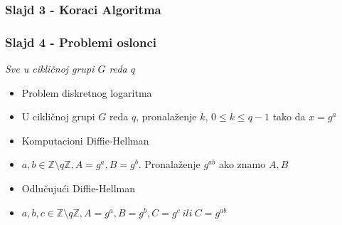 \documentclass[14pt]{beamer}
\begin{document}
\begin{frame}[fragile]\frametitle{Slajd 3 - Koraci Algoritma}
    \begin{table}[h]
        \begin{center}
        \caption{Tajnost promenljivih u toku algoritma}
        \end{center}
    \end{table}

\end{frame}

\begin{frame}[fragile]\frametitle{Slajd 4 - Problemi oslonci}
    \small
    \emph{Sve u cikličnoj grupi $G$ reda $q$}
	\begin{itemize}	
		\item Problem diskretnog logaritma
        \item[] U cikličnoj grupi $G$ reda $q$, pronalaženje $k$, $0 \le k \le q - 1$ tako da $x = g^a$ \pause
        \item Komputacioni Diffie-Hellman
        \item[] $a, b \in \mathbb{Z}\setminus q\mathbb{Z}, A = g^a, B = g^b$. Pronalaženje $g^{ab}$ ako znamo $A,B$ \pause
        \item Odlučujući Diffie-Hellman
        \item[] $a, b, c \in \mathbb{Z}\setminus q\mathbb{Z}, A=g^a, B=g^b, C=g^c\ ili\ C=g^{ab}$
	\end{itemize}
\end{frame}
\end{document}
